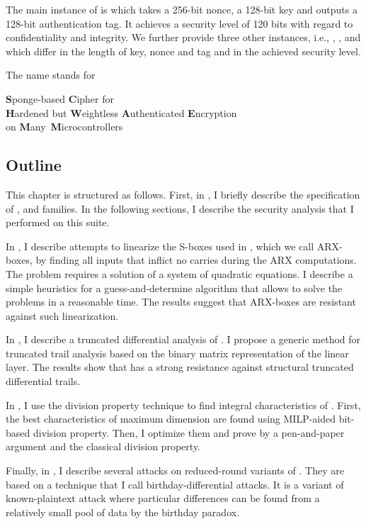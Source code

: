 The main instance of \aead{} is  which takes a 256-bit nonce, a 128-bit key and outputs a 128-bit authentication tag. It achieves a security level of 120 bits with regard to confidentiality and integrity.
We further provide three other instances, i.e., , , and  which differ in the length of key, nonce and tag and in the achieved security level.

The name \aead{} stands for
\begin{center}
  \textbf{S}ponge-based \textbf{C}ipher for
  \\
  \textbf{H}ardened but \textbf{W}eightless \textbf{A}uthenticated \textbf{E}ncryption \\
  on \textbf{M}any~\textbf{M}icrocontrollers
\end{center}


\subsection*{Outline}
This chapter is structured as follows. First, in , I briefly describe the specification of \aCipher{},\hash{} and \aead{} families. In the following sections, I describe the security analysis that I performed on this suite.

In , I describe attempts to linearize the S-boxes used in \aCipher{}, which we call ARX-boxes, by finding all inputs that inflict no carries during the ARX computations. The problem requires a solution of a system of quadratic equations. I describe a simple heuristics for a guess-and-determine algorithm that allows to solve the problems in a reasonable time. The results suggest that ARX-boxes are resistant against such linearization.

In , I describe a truncated differential analysis of \aCipher{}. I propose a generic method for truncated trail analysis based on the binary matrix representation of the linear layer. The results show that \aCipher{} has a strong resistance against structural truncated differential trails.

In , I use the division property technique to find integral characteristics of \aCipher{}. First, the best characteristics of maximum dimension are found using MILP-aided bit-based division property. Then, I optimize them and prove by a pen-and-paper argument and the classical division property.

Finally, in , I describe several attacks on reduced-round variants of \aead{}. They are based on a technique that I call birthday-differential attacks. It is a variant of known-plaintext attack where particular differences can be found from a relatively small pool of data by the birthday paradox.